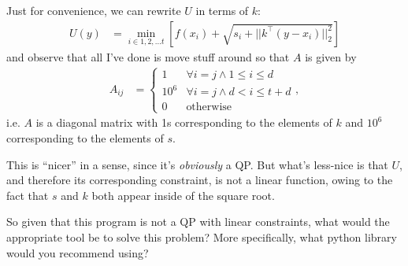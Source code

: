 \documentclass[11pt]{article}
\begin{document}
Just for convenience, we can rewrite $U$ in terms of $k$:
\begin{align}
U(y) &= \min_{i \in 1,2,\dots t} \left[ f(x_i) + \sqrt{s_i + ||k^\top (y - x_i)||_2^2} \right]
\end{align}
and observe that all I've done is move stuff around so that $A$ is given by 
\begin{align}
  A_{ij} &=
  \begin{cases}
    1 &\forall i = j \land 1 \le i \le d \\
    10^6 &\forall i = j \land d < i \le t + d \\
    0 &\text{otherwise}
  \end{cases},
\end{align}
i.e. $A$ is a diagonal matrix with 1s corresponding to the elements of $k$ and $10^6$ corresponding to the elements of $s$.

This is ``nicer'' in a sense, since it's \textit{obviously} a QP. But what's less-nice is that $U$, and therefore its corresponding constraint, is not a linear function, owing to the fact that $s$ and $k$ both appear inside of the square root.

So given that this program is not a QP with linear constraints, what would the appropriate tool be to solve this problem? More specifically, what python library would you recommend using?
\end{document}
